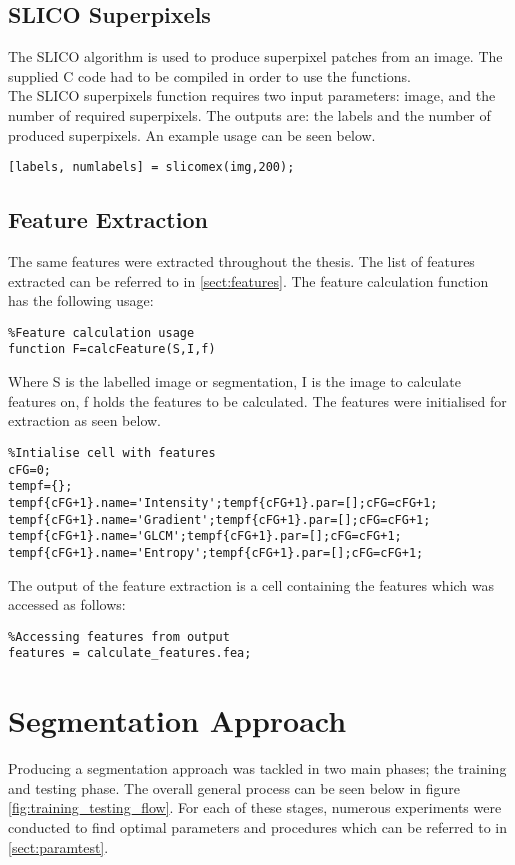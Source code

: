 \subsection{SLICO Superpixels}
\label{sect:slico}
The SLICO algorithm is used to produce superpixel patches from an image. The supplied C code had to be compiled in order to use the functions.
\\[1\baselineskip]
 The SLICO superpixels function requires two input parameters: image, and the number of required superpixels. The outputs are: the labels and the number of produced superpixels. An example usage can be seen below. 
\begin{lstlisting}
[labels, numlabels] = slicomex(img,200);
\end{lstlisting}
\subsection{Feature Extraction}
\label{sect:calcFeature}
The same features were extracted throughout the thesis. The list of features extracted can be referred to in \ref{sect:features}. The feature calculation function has the following usage:
\begin{lstlisting}
%Feature calculation usage
function F=calcFeature(S,I,f)
\end{lstlisting}
\medskip
Where S is the labelled image or segmentation, I is the image to calculate features on, f holds the features to be calculated. The features were initialised for extraction as seen below.
\begin{lstlisting}
%Intialise cell with features
cFG=0;
tempf={};
tempf{cFG+1}.name='Intensity';tempf{cFG+1}.par=[];cFG=cFG+1;
tempf{cFG+1}.name='Gradient';tempf{cFG+1}.par=[];cFG=cFG+1;
tempf{cFG+1}.name='GLCM';tempf{cFG+1}.par=[];cFG=cFG+1;
tempf{cFG+1}.name='Entropy';tempf{cFG+1}.par=[];cFG=cFG+1;
\end{lstlisting}
\medskip
The output of the feature extraction is a cell containing the features which was accessed as follows:
\begin{lstlisting}
%Accessing features from output
features = calculate_features.fea;
\end{lstlisting}

\section{Segmentation Approach}
\label{sect: segapproach}
Producing a segmentation approach was tackled in two main phases; the training and testing phase. The overall general process can be seen below in figure \ref{fig:training_testing_flow}. For each of these stages, numerous experiments were conducted to find optimal parameters and procedures which can be referred to in \ref{sect:paramtest}.

